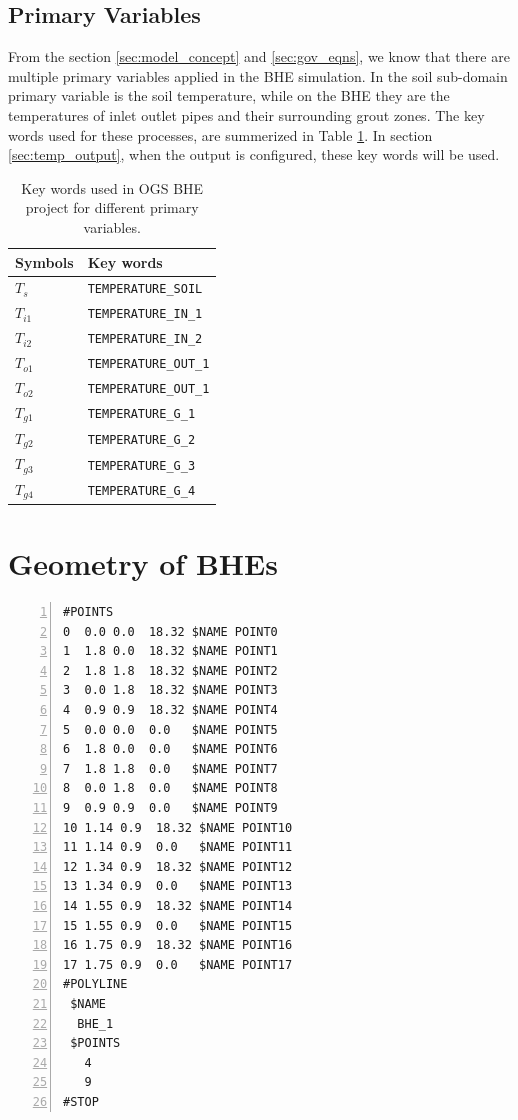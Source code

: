 \subsection{Primary Variables}

From the section \ref{sec:model_concept} and \ref{sec:gov_eqns}, we know that there are multiple primary variables applied in the BHE simulation. In the soil sub-domain primary variable is the soil temperature, while on the BHE they are the temperatures of inlet outlet pipes and their surrounding grout zones. The key words used for these processes, are summerized in Table \ref{tab:pvar_keywords}. In section \ref{sec:temp_output}, when the output is configured, these key words will be used. 

\begin{table}
\caption{Key words used in OGS BHE project for different primary variables. }
\label{tab:pvar_keywords}
\centering
\begin{tabular}{l l }
\hline
Symbols    & Key words  \\
\hline
$T_s$             & \texttt{TEMPERATURE\_SOIL} \\
$T_{i1}$          & \texttt{TEMPERATURE\_IN\_1} \\
$T_{i2}$          & \texttt{TEMPERATURE\_IN\_2} \\
$T_{o1}$          & \texttt{TEMPERATURE\_OUT\_1} \\
$T_{o2}$          & \texttt{TEMPERATURE\_OUT\_1} \\
$T_{g1}$          & \texttt{TEMPERATURE\_G\_1} \\
$T_{g2}$          & \texttt{TEMPERATURE\_G\_2} \\
$T_{g3}$          & \texttt{TEMPERATURE\_G\_3} \\
$T_{g4}$          & \texttt{TEMPERATURE\_G\_4} \\
\hline
\end{tabular}
\end{table}

\section{Geometry of BHEs}

\begin{Verbatim}[gobble=0, 
                 frame=single, 
                 label=Geometry Definition in the GLI File of an OpenGeoSys Project, 
                 numbers=left]
#POINTS
0  0.0 0.0  18.32 $NAME POINT0
1  1.8 0.0  18.32 $NAME POINT1  
2  1.8 1.8  18.32 $NAME POINT2  
3  0.0 1.8  18.32 $NAME POINT3  
4  0.9 0.9  18.32 $NAME POINT4  
5  0.0 0.0  0.0   $NAME POINT5
6  1.8 0.0  0.0   $NAME POINT6  
7  1.8 1.8  0.0   $NAME POINT7  
8  0.0 1.8  0.0   $NAME POINT8  
9  0.9 0.9  0.0   $NAME POINT9  
10 1.14 0.9  18.32 $NAME POINT10  
11 1.14 0.9  0.0   $NAME POINT11  
12 1.34 0.9  18.32 $NAME POINT12  
13 1.34 0.9  0.0   $NAME POINT13
14 1.55 0.9  18.32 $NAME POINT14  
15 1.55 0.9  0.0   $NAME POINT15
16 1.75 0.9  18.32 $NAME POINT16  
17 1.75 0.9  0.0   $NAME POINT17
#POLYLINE
 $NAME
  BHE_1
 $POINTS
   4
   9
#STOP
\end{Verbatim}

